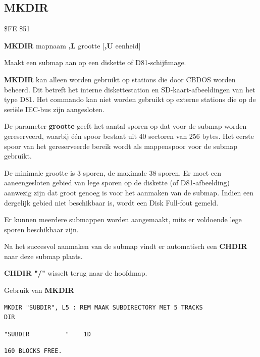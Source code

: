 \subsection{MKDIR}
\begin{description}[leftmargin=2cm,style=nextline]
\item [Token:]    \$FE \$51

\item [Formaat:]   {\bf MKDIR} mapnaam {\bf,L} grootte [{\bf,U} eenheid]

\item [Gebruik:]    Maakt een submap aan op een diskette of D81-schijfimage.

                  \dirnamedefinition

                  {\bf MKDIR} kan alleen worden gebruikt op stations die door CBDOS worden beheerd. Dit betreft het interne diskettestation en SD-kaart-afbeeldingen van het type D81. Het commando kan niet worden gebruikt op externe stations die op de seriële IEC-bus zijn aangesloten.

De parameter {\bf grootte} geeft het aantal sporen op dat voor de submap worden gereserveerd, waarbij één spoor bestaat uit 40 sectoren van 256 bytes. Het eerste spoor van het gereserveerde bereik wordt als mappenspoor voor de submap gebruikt.

De minimale grootte is 3 sporen, de maximale 38 sporen. Er moet een aaneengesloten gebied van lege sporen op de diskette (of D81-afbeelding) aanwezig zijn dat groot genoeg is voor het aanmaken van de submap. Indien een dergelijk gebied niet beschikbaar is, wordt een Disk Full-fout gemeld.

Er kunnen meerdere submappen worden aangemaakt, mits er voldoende lege sporen beschikbaar zijn.

Na het succesvol aanmaken van de submap vindt er automatisch een {\bf CHDIR} naar deze submap plaats.

{\bf CHDIR "/"} wisselt terug naar de hoofdmap.

\item [Voorbeeld:]  Gebruik van {\bf MKDIR}

\begin{tcolorbox}[colback=black,coltext=white]
\verbatimfont{\codefont}
\begin{verbatim}
MKDIR "SUBDIR", L5 : REM MAAK SUBDIRECTORY MET 5 TRACKS
DIR
\end{verbatim}
\selectfont{\codefont 0}
\begin{tcolorbox}[colback=white,coltext=black,arc=0mm,boxrule=0mm,
       left*=0.5mm,right*=0mm,top=0mm,bottom=0mm,nobeforeafter,       left skip=0.5mm,       width=28mm,height=3mm,valign=center]
\begin{verbatim}
"SUBDIR          "    1D
\end{verbatim}
\end{tcolorbox}
\begin{verbatim}
160 BLOCKS FREE.
\end{verbatim}
\end{tcolorbox}
\end{description}

